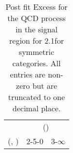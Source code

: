\begin{table}[h!]
\tiny
\centering
\caption{Post fit Excess for the QCD process in the signal region for 2.1\ifb for symmetric categories. All entries are non-zero but are truncated to one decimal place.\label{tab:excessseppost_sig_qcd_sym}}
\begin{tabular}
{ccc}
	\hline\hline
	& \multicolumn{2}{c}{\scalht (\gev)} \\ 
	 (\njet,  \nb) & 2-5-0 & 3-$\infty$ \\ [0.8ex] 
\hline
	\hline
	\hline
\end{tabular}
\end{table}
